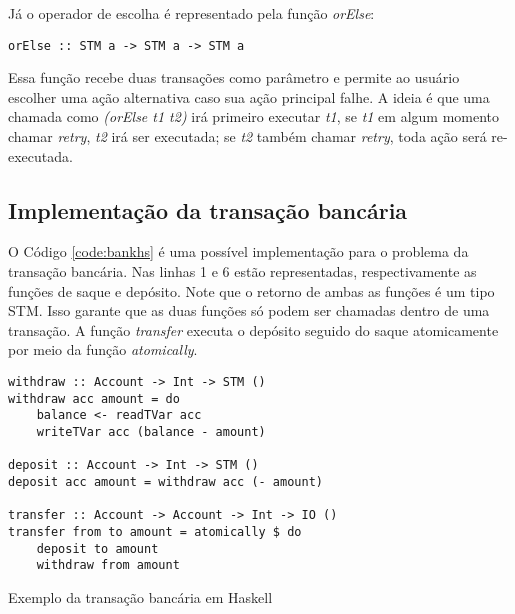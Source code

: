 Já o operador de escolha é representado pela função \emph{orElse}:
\begin{verbatim}
orElse :: STM a -> STM a -> STM a
\end{verbatim}

Essa função recebe duas transações como parâmetro e permite ao usuário escolher uma ação alternativa caso sua ação principal falhe. A ideia é que uma chamada como \emph{(orElse t1 t2)} irá primeiro executar \emph{t1}, se \emph{t1} em algum momento chamar \emph{retry}, \emph{t2} irá ser executada; se \emph{t2} também chamar \emph{retry}, toda ação será re-executada.


\subsection{Implementação da transação bancária}

O Código \ref{code:bankhs} é uma possível implementação para o problema da transação bancária. Nas linhas 1 e 6 estão representadas, respectivamente as funções de saque e depósito. Note que o retorno de ambas as funções é um tipo STM. Isso garante que as duas funções só podem ser chamadas dentro de uma transação. A função \emph{transfer} executa o depósito seguido do saque atomicamente por meio da função \emph{atomically}.

\begin{listing}
  \begin{verbatim}
withdraw :: Account -> Int -> STM ()
withdraw acc amount = do
    balance <- readTVar acc
    writeTVar acc (balance - amount)

deposit :: Account -> Int -> STM ()
deposit acc amount = withdraw acc (- amount)

transfer :: Account -> Account -> Int -> IO ()
transfer from to amount = atomically $ do
    deposit to amount
    withdraw from amount
  \end{verbatim}
  \caption{Exemplo da transação bancária em Haskell}
  \label{code:bankhs}
\end{listing}
